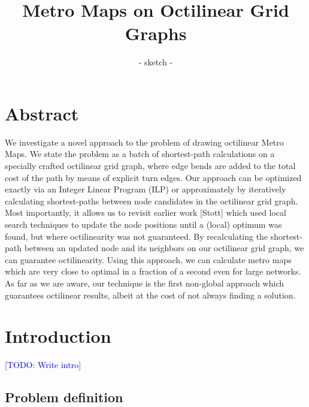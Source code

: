 \documentclass{sig-alternate-sigmod09}
\newcommand\TODO[1]{\textcolor{blue}{\small [TODO: #1]}}
\begin{document}
\title{Metro Maps on Octilinear Grid Graphs}
\subtitle{- sketch -}


\maketitle

\section{Abstract}

We investigate a novel approach to the problem of drawing octilinear Metro Maps.
We state the problem as a batch of shortest-path calculations on a specially crafted octilinear grid graph, where edge bends are added to the total cost of the path by means of explicit turn edges.
Our approach can be optimized exactly via an Integer Linear Program (ILP) or approximately by iteratively calculating shortest-paths between node candidates in the octilinear grid graph.
Most importantly, it allows us to revisit earlier work [Stott] which used local search techniques to update the node positions until a (local) optimum was found, but where octilinearity was not guaranteed.
By recalculating the shortest-path between an updated node and its neighbors on our octilinear grid graph, we can guarantee octilinearity.
Using this approach, we can calculate metro maps which are very close to optimal in a fraction of a second even for large networks.
As far as we are aware, our technique is the first non-global approach which guarantees octilinear results, albeit at the cost of not always finding a solution.

\section{Introduction}

\TODO{Write intro}

\subsection{Problem definition}
\end{document}
